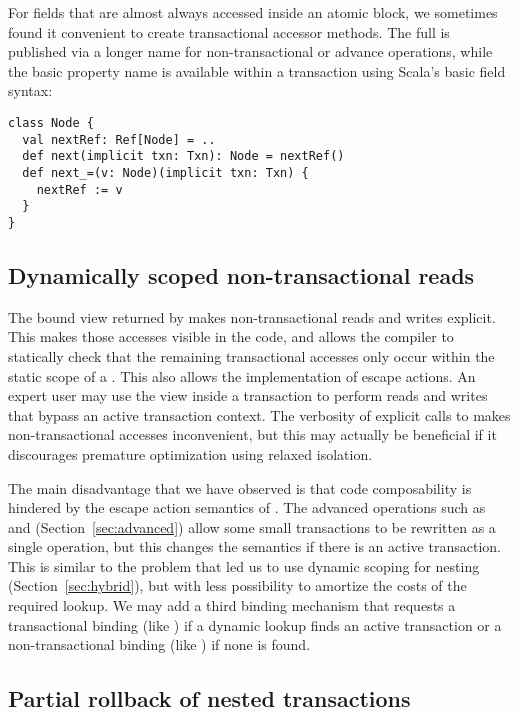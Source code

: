 For fields that are almost always accessed inside an atomic block, we
sometimes found it convenient to create transactional accessor methods.
The full  is published via a longer name for non-transactional
or advance operations, while the basic property name is available within
a transaction using Scala's basic field syntax:
\lstset{numbers=none}
\lstset{xleftmargin=0.125in}
\begin{lstlisting}
class Node {
  val nextRef: Ref[Node] = ..
  def next(implicit txn: Txn): Node = nextRef()
  def next_=(v: Node)(implicit txn: Txn) {
    nextRef := v 
  }
}
\end{lstlisting}
\lstset{xleftmargin=0.25in}
\lstset{numbers=left}

\subsection{Dynamically scoped non-transactional reads}

The bound view returned by  makes
non-transactional reads and writes explicit.  This makes those accesses
visible in the code, and allows the compiler to statically check that
the remaining transactional accesses only occur within the static scope
of a .  This also allows the implementation of escape actions.
An expert user may use the  view inside a transaction to
perform reads and writes that bypass an active transaction context.
The verbosity of explicit calls to  makes non-transactional
accesses inconvenient, but this may actually be beneficial if it discourages
premature optimization using relaxed isolation.

The main disadvantage that we have observed is that code composability is
hindered by the escape action semantics of .  The advanced
 operations such as  and 
(Section~\ref{sec:advanced}) allow some small transactions to be
rewritten as a single operation, but this changes the semantics if
there is an active transaction.  This is similar to the problem that
led us to use dynamic scoping for nesting (Section~\ref{sec:hybrid}),
but with less possibility to amortize the costs of the required
 lookup.  We may add a third binding mechanism that
requests a transactional binding (like ) if a
dynamic lookup finds an active transaction or a non-transactional binding
(like ) if none is found.

\subsection{Partial rollback of nested transactions}


